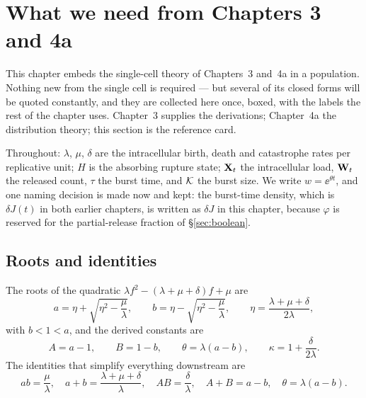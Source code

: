 
\section{What we need from Chapters 3 and 4a}
\label{sec:needed}

This chapter embeds the single-cell theory of Chapters~3 and~4a in a
population. Nothing new from the single cell is required --- but several of
its closed forms will be quoted constantly, and they are collected here once,
boxed, with the labels the rest of the chapter uses. Chapter~3 supplies the
derivations; Chapter~4a the distribution theory; this section is the
reference card.

Throughout: $\lambda$, $\mu$, $\delta$ are the intracellular birth, death and
catastrophe rates per replicative unit; $H$ is the absorbing rupture state;
${{\bf X}_t}$ the intracellular load, ${{\bf W}_t}$ the released count, $\tau$ the burst
time, and $\mathcal{K}$ the burst size. We write $w=\ee^{\theta t}$, and one
naming decision is made now and kept: the burst-time density, which is
$\delta J(t)$ in both earlier chapters, is written as $\delta J$ in this
chapter, because $\varphi$ is reserved for the partial-release fraction of
\S\ref{sec:boolean}.

\subsection{Roots and identities}
\label{sec:needed-roots}

The roots of the quadratic $\lambda f^2-(\lambda+\mu+\delta)f+\mu$ are
\begin{equation}
a=\eta+\sqrt{\eta^2-\frac{\mu}{\lambda}},\qquad
b=\eta-\sqrt{\eta^2-\frac{\mu}{\lambda}},\qquad
\eta=\frac{\lambda+\mu+\delta}{2\lambda},
\end{equation}
with $b<1<a$, and the derived constants are
\begin{equation}
A=a-1,\qquad B=1-b,\qquad \theta=\lambda(a-b),\qquad \kappa=1+\frac{\delta}{2\lambda}.
\end{equation}
The identities that simplify everything downstream are
\begin{equation}
\boxed{ab=\frac{\mu}{\lambda},\quad a+b=\frac{\lambda+\mu+\delta}{\lambda},\quad
AB=\frac{\delta}{\lambda},\quad A+B=a-b,\quad \theta=\lambda(a-b).}
\label{eq:AB}
\end{equation}

